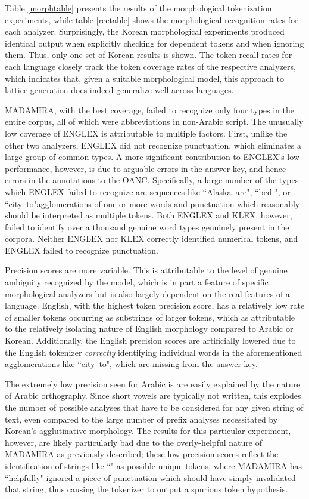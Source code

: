 Table \ref{morphtable} presents the results of the morphological tokenization experiments, while table \ref{rectable} shows the morphological recognition rates for each analyzer. Surprisingly, the Korean morphological experiments produced identical output when explicitly checking for dependent tokens and when ignoring them. Thus, only one set of Korean results is shown. The token recall rates for each language closely track the token coverage rates of the respective analyzers, which indicates that, given a suitable morphological model, this approach to lattice generation does indeed generalize well across languages.

MADAMIRA, with the best coverage, failed to recognize only four types in the entire corpus, all of which were abbreviations in non-Arabic script. The unusually low coverage of ENGLEX is attributable to multiple factors. First, unlike the other two analyzers, ENGLEX did not recognize punctuation, which eliminates a large group of common types. A more significant contribution to ENGLEX's low performance, however, is due to arguable errors in the answer key, and hence errors in the annotations to the OANC. Specifically, a large number of the types which ENGLEX failed to recognize are sequences like ``Alaska--are", ``bed-", or ``city--to"\textemdash agglomerations of one or more words and punctuation which reasonably should be interpreted as multiple tokens. Both ENGLEX and KLEX, however, failed to identify over a thousand genuine word types genuinely present in the corpora. Neither ENGLEX nor KLEX correctly identified numerical tokens, and ENGLEX failed to recognize punctuation.

Precision scores are more variable. This is attributable to the level of genuine ambiguity recognized by the model, which is in part a feature of specific morphological analyzers but is also largely dependent on the real features of a language. English, with the highest token precision score, has a relatively low rate of smaller tokens occurring as substrings of larger tokens, which as attributable to the relatively isolating nature of English morphology compared to Arabic or Korean. Additionally, the English precision scores are artificially lowered due to the English tokenizer \textit{correctly} identifying individual words in the aforementioned agglomerations like ``city--to", which are missing from the answer key.

The extremely low precision seen for Arabic is are easily explained by the nature of Arabic orthography. Since short vowels are typically not written, this explodes the number of possible analyses that have to be considered for any given string of text, even compared to the large number of prefix analyses necessitated by Korean's agglutinative morphology. The results for this particular experiment, however, are likely particularly bad due to the overly-helpful nature of MADAMIRA as previously described; these low precision scores reflect the identification of strings like \novocalize``" as possible unique tokens, where MADAMIRA has ``helpfully" ignored a piece of punctuation which should have simply invalidated that string, thus causing the tokenizer to output a spurious token hypothesis.

